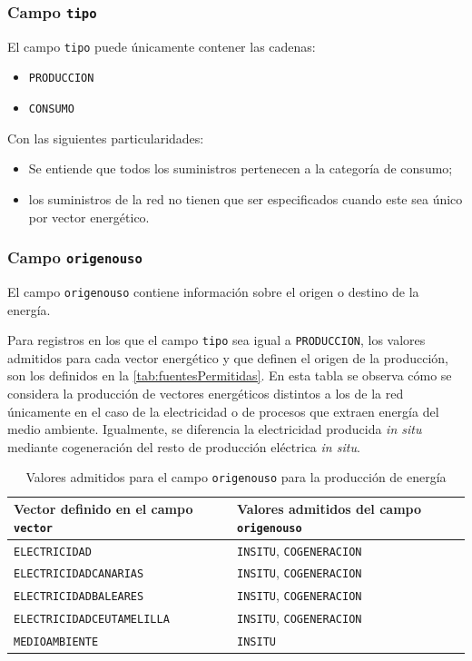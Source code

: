 \documentclass[10pt,notitlepage,oneside,a4paper]{article}
\begin{document}
\subsubsection{Campo \texttt{tipo}}

El campo \texttt{tipo} puede únicamente contener las cadenas:

\begin{itemize}
\item \texttt{PRODUCCION}
\item \texttt{CONSUMO}
\end{itemize}

Con las siguientes particularidades:

\begin{itemize}
\item Se entiende que todos los suministros pertenecen a la categoría de consumo;
\item los suministros de la red no tienen que ser especificados cuando este sea único por vector energético.
\end{itemize}

\subsubsection{Campo \texttt{origenouso}}

El campo \texttt{origenouso} contiene información sobre el origen o destino de la energía.

Para registros en los que el campo \texttt{tipo} sea igual a \texttt{PRODUCCION}, los valores admitidos para cada vector energético y que definen el origen de la producción, son los definidos en la \autoref{tab:fuentesPermitidas}. En esta tabla se observa cómo se considera la producción de vectores energéticos distintos a los de la red únicamente en el caso de la electricidad o de procesos que extraen energía del medio ambiente. Igualmente, se diferencia la electricidad producida \textit{in situ} mediante cogeneración del resto de producción eléctrica \textit{in situ}.

\begin{table}[H]
\centering
\small
\caption{Valores admitidos para el campo \texttt{origenouso} para la producción de energía}\label{tab:fuentesPermitidas}
\begin{tabular}{ll}
    \toprule
    \textbf{Vector definido en el campo \texttt{vector}} & \textbf{Valores admitidos del campo \texttt{origenouso}}\\
    \midrule
    \texttt{ELECTRICIDAD}             & \texttt{INSITU}, \texttt{COGENERACION}\\
    \texttt{ELECTRICIDADCANARIAS}     & \texttt{INSITU}, \texttt{COGENERACION}\\
    \texttt{ELECTRICIDADBALEARES}     & \texttt{INSITU}, \texttt{COGENERACION}\\
    \texttt{ELECTRICIDADCEUTAMELILLA} & \texttt{INSITU}, \texttt{COGENERACION}\\
    \texttt{MEDIOAMBIENTE}            & \texttt{INSITU}\\
    \bottomrule
\end{tabular}
\end{table}
\end{document}
